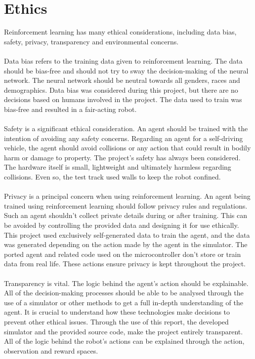 \documentclass[a4paper,12pt]{article}
\begin{document}
\section{Ethics}
Reinforcement learning has many ethical considerations, including data bias, safety, privacy, transparency and environmental concerns.
\\\\
Data bias refers to the training data given to reinforcement learning. The data should be bias-free and should not try to sway the decision-making of the neural network. The neural network should be neutral towards all genders, races and demographics. Data bias was considered during this project, but there are no decisions based on humans involved in the project. The data used to train was bias-free and resulted in a fair-acting robot.
\\\\
Safety is a significant ethical consideration. An agent should be trained with the intention of avoiding any safety concerns. Regarding an agent for a self-driving vehicle, the agent should avoid collisions or any action that could result in bodily harm or damage to property. The project's safety has always been considered. The hardware itself is small, lightweight and ultimately harmless regarding collisions. Even so, the test track used walls to keep the robot confined. 
\\\\
Privacy is a principal concern when using reinforcement learning. An agent being trained using reinforcement learning should follow privacy rules and regulations. Such an agent shouldn't collect private details during or after training. This can be avoided by controlling the provided data and designing it for use ethically. This project used exclusively self-generated data to train the agent, and the data was generated depending on the action made by the agent in the simulator. The ported agent and related code used on the microcontroller don't store or train data from real life. These actions ensure privacy is kept throughout the project. 
\\\\
Transparency is vital. The logic behind the agent's action should be explainable. All of the decision-making processes should be able to be analysed through the use of a simulator or other methods to get a full in-depth understanding of the agent. It is crucial to understand how these technologies make decisions to prevent other ethical issues. Through the use of this report, the developed simulator and the provided source code, make the project entirely transparent. All of the logic behind the robot's actions can be explained through the action, observation and reward spaces. 
\end{document}
